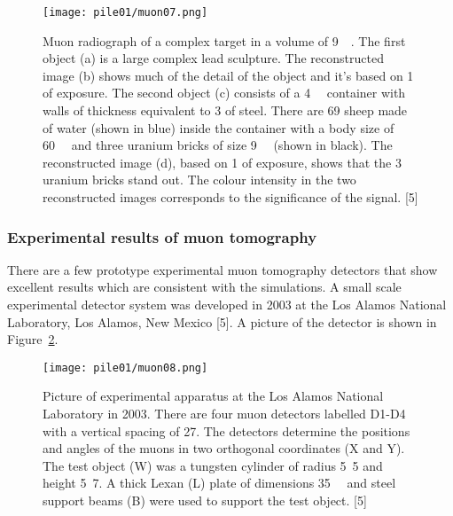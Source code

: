 \documentclass[twoside,titlepage,11pt,twocolumn,a4paper]{article}
\begin{document}
\begin{figure}
  \texttt{[image: pile01/muon07.png]}
  \caption{Muon radiograph of a complex target in a volume of
    \unit{9}{\cubic\metre}. The first object (a) is a
    large complex lead sculpture. The reconstructed image (b) shows
    much of the detail of the object and it’s based on
    \unit{1}{\minute} of exposure. The second object (c) consists of a
    \unit{4}{\cubic\metre} container with walls of
    thickness equivalent to \unit{3}{\milli\metre} of steel. There are
    69 sheep made of water (shown in blue) inside the container with a
    body size of \unit{60}{\cubic{\centi\metre}} and
    three uranium bricks of size
    \unit{9}{\cubic{\centi\metre}} (shown in
    black). The reconstructed image (d), based on \unit{1}{\minute} of
    exposure, shows that the 3 uranium bricks stand out. The colour
    intensity in the two reconstructed images corresponds to the
    significance of the signal. [5]}
  \label{fig:muon07}
\end{figure}

\subsubsection{Experimental results of muon tomography}
There are a few prototype experimental muon tomography detectors that
show excellent results which are consistent with the simulations.  A
small scale experimental detector system was developed in 2003 at the
Los Alamos National Laboratory, Los Alamos, New Mexico [5]. A picture
of the detector is shown in Figure~\ref{fig:muon08}.

\begin{figure}
  \texttt{[image: pile01/muon08.png]}
  \caption{Picture of experimental apparatus at the Los Alamos
    National Laboratory in 2003. There are four muon detectors
    labelled D1-D4 with a vertical spacing of
    \unit{27}{\centi\metre}. The detectors determine the positions and
    angles of the muons in two orthogonal coordinates (X and Y). The
    test object (W) was a tungsten cylinder of radius
    \unit{5.5}{\centi\metre} and height \unit{5.7}{\centi\metre}. A
    thick Lexan (L) plate of dimensions
    \unit{35}{\cubic{\centi\metre}} and steel support
    beams (B) were used to support the test object. [5]}
  \label{fig:muon08}
\end{figure}
\end{document}
